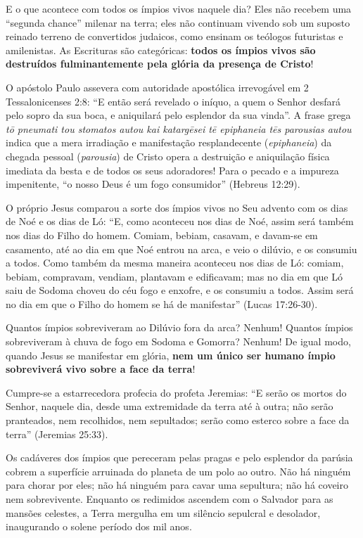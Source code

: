 E o que acontece com todos os ímpios vivos naquele dia?
Eles não recebem uma ``segunda chance'' milenar na terra; eles não continuam vivendo sob um suposto reinado terreno de convertidos judaicos, como ensinam os teólogos futuristas e amilenistas. As Escrituras são categóricas: \textbf{todos os ímpios vivos são destruídos fulminantemente pela glória da presença de Cristo}!

O apóstolo Paulo assevera com autoridade apostólica irrevogável em 2 Tessalonicenses 2:8:
``E então será revelado o iníquo, a quem o Senhor desfará pelo sopro da sua boca, e aniquilará pelo esplendor da sua vinda''.
A frase grega \textit{tō pneumati tou stomatos autou kai katargēsei tē epiphaneia tēs parousias autou} indica que a mera irradiação e manifestação resplandecente (\textit{epiphaneia}) da chegada pessoal (\textit{parousia}) de Cristo opera a destruição e aniquilação física imediata da besta e de todos os seus adoradores! Para o pecado e a impureza impenitente, ``o nosso Deus é um fogo consumidor'' (Hebreus 12:29).

O próprio Jesus comparou a sorte dos ímpios vivos no Seu advento com os dias de Noé e os dias de Ló:
``E, como aconteceu nos dias de Noé, assim será também nos dias do Filho do homem. Comiam, bebiam, casavam, e davam-se em casamento, até ao dia em que Noé entrou na arca, e veio o dilúvio, e os consumiu a todos. Como também da mesma maneira aconteceu nos dias de Ló: comiam, bebiam, compravam, vendiam, plantavam e edificavam; mas no dia em que Ló saiu de Sodoma choveu do céu fogo e enxofre, e os consumiu a todos. Assim será no dia em que o Filho do homem se há de manifestar'' (Lucas 17:26-30).

Quantos ímpios sobreviveram ao Dilúvio fora da arca? Nenhum!
Quantos ímpios sobreviveram à chuva de fogo em Sodoma e Gomorra? Nenhum!
De igual modo, quando Jesus se manifestar em glória, \textbf{nem um único ser humano ímpio sobreviverá vivo sobre a face da terra}!

Cumpre-se a estarrecedora profecia do profeta Jeremias:
``E serão os mortos do Senhor, naquele dia, desde uma extremidade da terra até à outra; não serão pranteados, nem recolhidos, nem sepultados; serão como esterco sobre a face da terra'' (Jeremias 25:33).

Os cadáveres dos ímpios que pereceram pelas pragas e pelo esplendor da parúsia cobrem a superfície arruinada do planeta de um polo ao outro. Não há ninguém para chorar por eles; não há ninguém para cavar uma sepultura; não há coveiro nem sobrevivente. Enquanto os redimidos ascendem com o Salvador para as mansões celestes, a Terra mergulha em um silêncio sepulcral e desolador, inaugurando o solene período dos mil anos.



